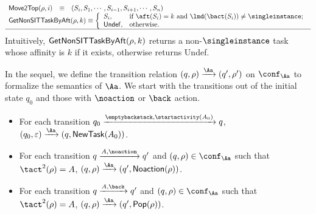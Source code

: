 {\[\begin{array}{rclrclrcl}
   {\sf Move2Top}(\rho, i) & \equiv &\multicolumn{4}{l}{(S_i,S_1,\cdots, S_{i-1},S_{i+1},\cdots, S_n)}\\
   \multicolumn{6}{l}
   { {\sf GetNonSITTaskByAft}(\rho, k) \equiv  \left\{ \begin{array}{ll}
   	S_i, & \mbox{if}~\aft(S_i)=k~\mbox{and}~\lmd(\bact(S_i)) \neq \singleinstance; \\
   	{\sf Undef}, & \mbox{otherwise}.
   	\end{array} \right.  }\\
 	\hline
 \end{array}
\]
%
Intuitively, ${\sf GetNonSITTaskByAft}(\rho, k)$ returns a non-$\singleinstance$ task whose affinity is $k$ if it exists, otherwise returns {\sf Undef}.


In the sequel, we define the transition relation $(q, \rho) \xrightarrow{\Aa} (q', \rho')$ on $\conf_\Aa$ to formalize the semantics of $\Aa$. %
We start with the transitions out of the initial state $q_0$ and those with $\noaction$ or $\back$ action.
\begin{itemize}
\item For each transition $q_0 \xrightarrow{\emptybackstack, \startactivity(A_0)}  q$, $(q_0, \varepsilon) \xrightarrow{\Aa} (q, {\sf NewTask}(A_0 ))$. %
%
\item For each transition $q\xrightarrow{A, \noaction} q'$ and $(q, \rho)  \in \conf_\Aa$ such that $\tact^2(\rho)=A$, $(q, \rho) \xrightarrow{\Aa} (q', {\sf Noaction}(\rho) )$. %
%
\item For each transition $q \xrightarrow{A, \back} q'$ and $(q, \rho)  \in \conf_\Aa$ such that $\tact^2(\rho)=A$,   $(q, \rho) \xrightarrow{\Aa} (q',  {\sf Pop}(\rho ))$.
\end{itemize}

}
